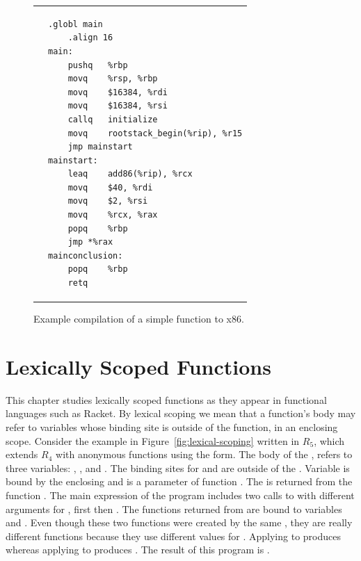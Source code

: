 \documentclass[11pt]{book}
\begin{document}
\begin{figure}[htbp]
\begin{tabular}{ll}
\begin{minipage}{0.3\textwidth}
\end{minipage}
&
\begin{minipage}{0.5\textwidth}
\begin{lstlisting}[basicstyle=\ttfamily\scriptsize]
	.globl main
	.align 16
main:
	pushq	%rbp
	movq	%rsp, %rbp
	movq	$16384, %rdi
	movq	$16384, %rsi
	callq	initialize
	movq	rootstack_begin(%rip), %r15
	jmp	mainstart
mainstart:
	leaq	add86(%rip), %rcx
	movq	$40, %rdi
	movq	$2, %rsi
	movq	%rcx, %rax
	popq	%rbp
	jmp	*%rax
mainconclusion:
	popq	%rbp
	retq
\end{lstlisting}
\end{minipage}
\end{tabular}
\caption{Example compilation of a simple function to x86.}
\label{fig:add-fun}
\end{figure}




\chapter{Lexically Scoped Functions}
\label{ch:lambdas}

This chapter studies lexically scoped functions as they appear in
functional languages such as Racket. By lexical scoping we mean that a
function's body may refer to variables whose binding site is outside
of the function, in an enclosing scope.
%
Consider the example in Figure~\ref{fig:lexical-scoping} written in
$R_5$, which extends $R_4$ with anonymous functions using the
 form.  The body of the , refers to three
variables: , , and . The binding sites for
 and  are outside of the . Variable
 is bound by the enclosing  and  is a
parameter of function . The  is returned from the
function . The main expression of the program includes two
calls to  with different arguments for , first
 then . The functions returned from  are bound
to variables  and . Even though these two functions
were created by the same , they are really different
functions because they use different values for . Applying
 to  produces  whereas applying  to
 produces . The result of this program is .
\end{document}
